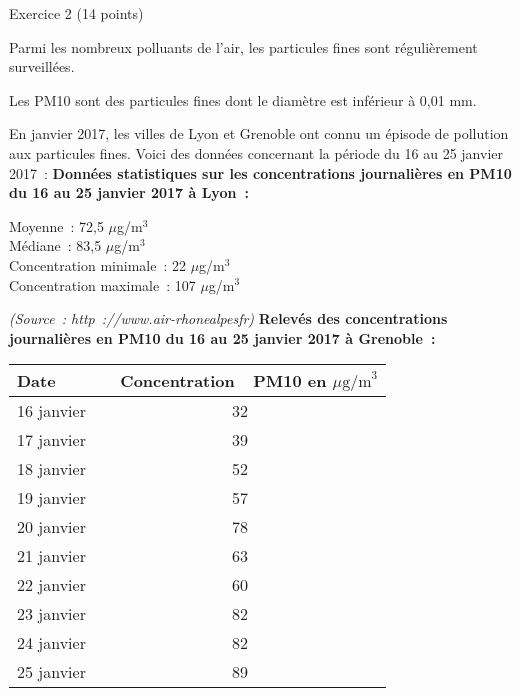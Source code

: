 
\begin{h2}Exercice 2 (14 points)\end{h2}
\medbreak
Parmi les nombreux polluants de l'air, les particules fines sont régulièrement surveillées.
\par
Les PM10 sont des particules fines dont le diamètre est inférieur à 0,01 mm.
\par
En janvier 2017, les villes de Lyon et Grenoble ont connu un épisode de pollution aux particules fines. Voici des données concernant la période du 16 au 25 janvier 2017~:
\medbreak
     \textbf{Données statistiques sur les concentrations journalières en PM10 du
     16 au 25 janvier 2017 à Lyon~:}
     \par
\begin{indent}
    Moyenne~: 72,5 $\mu$g/m$^3$\\
    Médiane~: 83,5 $\mu$g/m$^3$\\
    Concentration minimale~: 22 $\mu$g/m$^3$\\
    Concentration maximale~: 107 $\mu$g/m$^3$\\ 
\end{indent}
      \emph{(Source~: http~://www.air-rhonealpesfr)}
\bigbreak
     \textbf{Relevés des concentrations journalières en PM10 du 16 au 25 janvier 2017 à
     Grenoble~:}\\
\begin{center}
     \begin{tabular}{|l|c|}\hline%
          Date 		&~~Concentration~~PM10  en $\mu\text{g/m}^3$\\ \hline
          16 janvier 	&32\\ \hline
          17 janvier 	&39\\ \hline
          18 janvier 	&52\\ \hline
          19 janvier 	&57\\ \hline
          20 janvier 	&78\\ \hline
          21 janvier 	&63\\ \hline
          22 janvier 	&60\\ \hline
          23 janvier 	&82\\ \hline
          24 janvier 	&82\\ \hline
          25 janvier 	&89\\ \hline
     \end{tabular}
\end{center}
\medbreak
